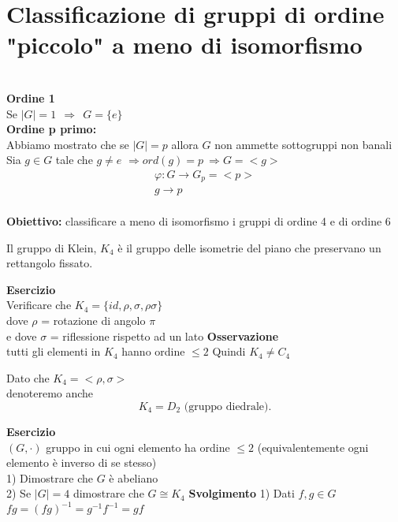 \documentclass[12px]{article}
\begin{document}
		\section{Classificazione di gruppi di ordine "piccolo" a meno di isomorfismo}\\
		\textbf{Ordine 1}\\
		Se $|G| = 1 \ \ \Rightarrow  \ \ G = \{e\}$\\
		\textbf{Ordine p primo:}\\
		Abbiamo mostrato che se $|G|=p$ allora  $G$ non ammette sottogruppi non banali\\
		Sia $g\in G$ tale che $g\neq e$
		$ \Rightarrow ord(g) = p \ \Rightarrow G = <g>$ \\
		\begin{gather*}
			\varphi: G \rightarrow G_p = <p>\\
			g \rightarrow p
		\end{gather*}\\
		\textbf{Obiettivo:} classificare a meno di isomorfismo i gruppi di ordine 4 e di ordine 6\\
		\begin{defi}[Klein,1884]
			Il gruppo di Klein, $K_4$ è il gruppo delle isometrie del piano che preservano un rettangolo fissato.
		\end{defi}
		\textbf{Esercizio}\\
		Verificare che $K_4 = \{id, \rho,\sigma, \rho\sigma\}$\\
		dove $\rho$ = rotazione di angolo $\pi$\\
		e dove  $\sigma$ = riflessione rispetto ad un lato
		\textbf{Osservazione}\\ tutti gli elementi in $K_4$ hanno ordine $\leq 2$ Quindi  $K_4\neq C_4$\\
		\begin{nota}
			Dato che $K_4 = <\rho,\sigma>$\\
			denoteremo anche
			\[
				K_4 = D_2 \text{ (gruppo diedrale)}
			.\] 
		\end{nota}
		\textbf{Esercizio}\\
		$(G,\cdot)$ gruppo in cui ogni elemento ha ordine $\leq 2$ (equivalentemente ogni elemento è inverso di se stesso)\\
		1) Dimostrare che $G$ è abeliano\\
		2) Se $|G| = 4$ dimostrare che  $G \cong K_4$
		\textbf{Svolgimento}
		1) Dati $f,g\in G$\\
		$fg = (fg)^{-1} = g^{-1}f^{-1} = gf$\\
\end{document}
